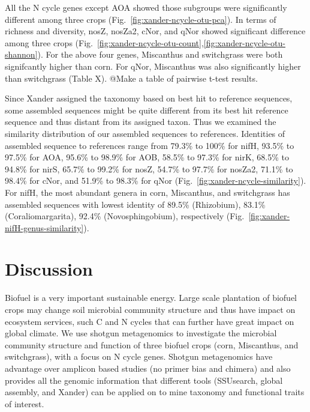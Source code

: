 \documentclass[12pt]{article}
\begin{document}


All the N cycle genes except AOA showed those subgroups were significantly different among three crops (Fig.~\ref{fig:xander-ncycle-otu-pca}). In terms of richness and diversity, nosZ, nosZa2, cNor, and qNor showed significant difference among three crops (Fig.~\ref{fig:xander-ncycle-otu-count},\ref{fig:xander-ncycle-otu-shannon}). For the above four genes, Miscanthus and switchgrass were both signifcantly higher than corn. For qNor, Miscanthus was also significantly higher than switchgrass (Table X). @Make a table of pairwise t-test results.

Since Xander assigned the taxonomy based on best hit to reference sequences, some assembled sequences might be quite different from its best hit reference sequence and thus distant from its assigned taxon. Thus we examined the similarity distribution of our assembled sequences to references. Identities of assembled sequence to references range from 79.3\% to 100\% for nifH, 93.5\% to 97.5\% for AOA, 95.6\% to 98.9\% for AOB, 58.5\% to 97.3\% for nirK, 68.5\% to 94.8\% for nirS, 65.7\% to 99.2\% for nosZ, 54.7\% to 97.7\% for nosZa2, 71.1\% to 98.4\% for cNor, and 51.9\% to 98.3\% for qNor (Fig.~\ref{fig:xander-ncycle-similarity}). For nifH, the most abundant genera in corn, Miscanthus, and switchgrass has assembled sequences with lowest identity of 89.5\% (Rhizobium), 83.1\% (Coraliomargarita), 92.4\% (Novosphingobium), respectively (Fig.~\ref{fig:xander-nifH-genus-similarity}).



\section{Discussion}

Biofuel is a very important sustainable energy. Large scale plantation of biofuel crops may change soil microbial community structure and thus have impact on ecosystem services, such C and N cycles that can further have great impact on global climate. We use shotgun metagenomics to investigate the microbial community structure and function of three biofuel crops (corn, Miscanthus, and switchgrass), with a focus on N cycle genes. Shotgun metagenomics have advantage over amplicon based studies (no primer bias and chimera) and also provides all the genomic information that different tools (SSUsearch, global assembly, and Xander) can be applied on to mine taxonomy and functional traits of interest.
\end{document}
